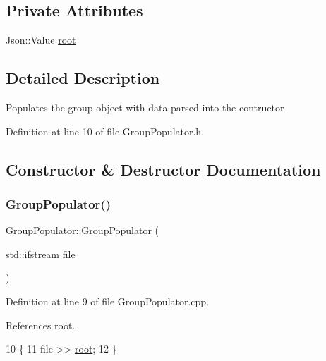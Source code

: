 \subsection*{Private Attributes}
\begin{DoxyCompactItemize}
\item 
Json\+::\+Value \hyperlink{class_group_populator_a161f0427ec538d3a99da2e53fdbc9b2b}{root}
\end{DoxyCompactItemize}


\subsection{Detailed Description}
Populates the group object with data parsed into the contructor 

Definition at line 10 of file Group\+Populator.\+h.



\subsection{Constructor \& Destructor Documentation}
\mbox{\label{class_group_populator_a90814524b9b87b4841bdc64f3c7e56ef}} 
\subsubsection{\texorpdfstring{Group\+Populator()}{GroupPopulator()}\hspace{0.1cm}{\footnotesize\ttfamily [1/2]}}
{\footnotesize\ttfamily Group\+Populator\+::\+Group\+Populator (\begin{DoxyParamCaption}\item[{std\+::ifstream}]{file }\end{DoxyParamCaption})}



Definition at line 9 of file Group\+Populator.\+cpp.



References root.


\begin{DoxyCode}
10 \{
11     file >> \hyperlink{class_group_populator_a161f0427ec538d3a99da2e53fdbc9b2b}{root};
12 \}
\end{DoxyCode}
\mbox{\label{class_group_populator_a8d125db2718e9d7bb70699094045f43b}} 
